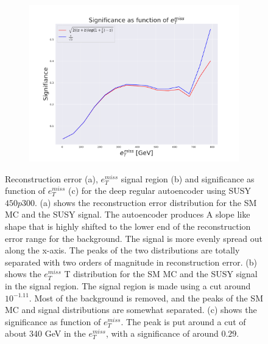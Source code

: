 \begin{figure}[H]
    \begin{subfigure}{.40\textwidth}
        \includegraphics[width=\textwidth]{Figures/AE_testing/big/2lep/significance_etmiss_800p0p050_-1.1125283423037047.pdf}
        \caption{}
        \label{fig:AE_2lep_big_signi_800_2}
    \end{subfigure}
    \hfill      
    \caption[2lep deep network | $800p50$ | AE | 2]{Reconstruction error (a), $e_T^{miss}$ signal region (b) and significance as function of 
    $e_T^{miss}$ (c) for the deep regular autoencoder using SUSY $450p300$. 
    (a) shows the reconstruction error distribution for the SM MC and the SUSY signal. 
    The autoencoder produces A slope like shape that is highly shifted to the lower end of the reconstruction error range
for the background. The signal is more evenly spread out along the x-axis. The peaks of the two distributions are totally separated
with two orders of magnitude in reconstruction error. (b) shows the $e_T^{miss}$
T distribution for the SM MC and the SUSY signal in the signal region. The signal region is made using a cut around
$10^{-1.11}$. Most of the background is removed, and the peaks of the SM MC and signal distributions are
somewhat separated. (c) shows the significance as function of $e_T^{miss}$. The peak is put 
around a cut of about 340 GeV in the $e_T^{miss}$, with a significance of around $0.29$.}
    \label{fig:AE_2lep_big_rec_sig_signi_800_2}
\end{figure}

